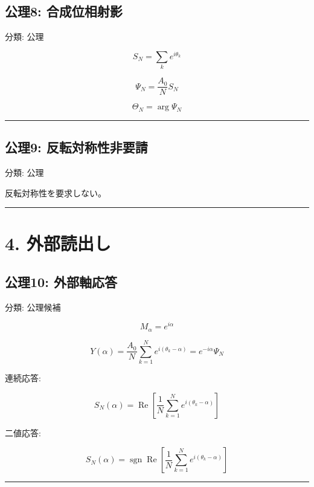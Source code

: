 \documentclass[
  a4paper,
]{ltjsarticle}
\begin{document}
\subsection{公理8:
合成位相射影}\label{ux516cux74068-ux5408ux6210ux4f4dux76f8ux5c04ux5f71}

分類: 公理

\[
S_N=\sum_k e^{i\theta_k}
\]

\[
\Psi_N=\frac{A_0}{N}S_N
\]

\[
\Theta_N=\arg\Psi_N
\]

\begin{center}\rule{0.5\linewidth}{0.5pt}\end{center}

\subsection{公理9:
反転対称性非要請}\label{ux516cux74069-ux53cdux8ee2ux5bfeux79f0ux6027ux975eux8981ux8acb}

分類: 公理

反転対称性を要求しない。

\begin{center}\rule{0.5\linewidth}{0.5pt}\end{center}

\section{4. 外部読出し}\label{ux5916ux90e8ux8aadux51faux3057}

\subsection{公理10:
外部軸応答}\label{ux516cux740610-ux5916ux90e8ux8ef8ux5fdcux7b54}

分類: 公理候補

\[
M_\alpha=e^{i\alpha}
\]

\[
Y(\alpha)=\frac{A_0}{N}\sum_{k=1}^{N}e^{i(\theta_k-\alpha)}
=e^{-i\alpha}\Psi_N
\]

連続応答:

\[
S_N(\alpha)=\operatorname{Re}\left[\frac{1}{N}\sum_{k=1}^{N}e^{i(\theta_k-\alpha)}\right]
\]

二値応答:

\[
S_N(\alpha)=\operatorname{sgn}\operatorname{Re}\left[\frac{1}{N}\sum_{k=1}^{N}e^{i(\theta_k-\alpha)}\right]
\]

\begin{center}\rule{0.5\linewidth}{0.5pt}\end{center}
\end{document}

